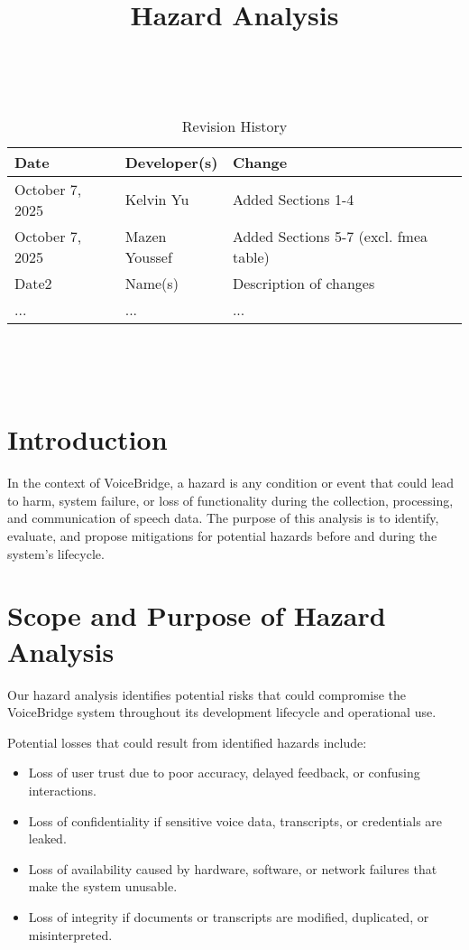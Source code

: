 \documentclass{article}
\title{Hazard Analysis\\\progname}
\author{\authname}
\date{}
\begin{document}
\maketitle
\thispagestyle{empty}

~\newpage


\begin{table}[hp]
\caption{Revision History} \label{TblRevisionHistory}
\begin{tabularx}{\textwidth}{llX}
\toprule
\textbf{Date} & \textbf{Developer(s)} & \textbf{Change}\\
\midrule
October 7, 2025 & Kelvin Yu & Added Sections 1-4\\
October 7, 2025 & Mazen Youssef & Added Sections 5-7 (excl. fmea table)\\
Date2 & Name(s) & Description of changes\\
... & ... & ...\\
\bottomrule
\end{tabularx}
\end{table}

~\newpage

\tableofcontents

~\newpage



\section{Introduction}

In the context of VoiceBridge, a hazard is any condition or event that could lead to harm, system failure, or loss of functionality during the collection, processing, and communication of speech data. 
The purpose of this analysis is to identify, evaluate, and propose mitigations for potential hazards before and during the system’s lifecycle.


\section{Scope and Purpose of Hazard Analysis}

Our hazard analysis identifies potential risks that could compromise the VoiceBridge system throughout its development lifecycle and operational use.

\vspace{3mm}
\noindent Potential losses that could result from identified hazards include:
\begin{itemize}
    \item Loss of user trust due to poor accuracy, delayed feedback, or confusing interactions. 
    \item Loss of confidentiality if sensitive voice data, transcripts, or credentials are leaked.
    \item Loss of availability caused by hardware, software, or network failures that make the system unusable.
    \item Loss of integrity if documents or transcripts are modified, duplicated, or misinterpreted.
\end{itemize}
\end{document}
